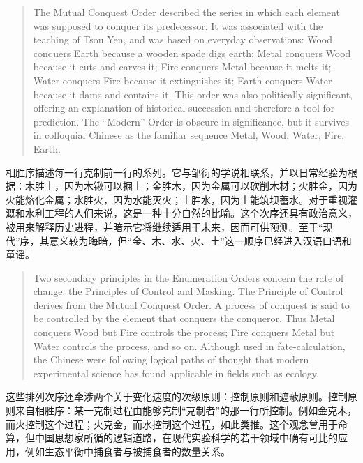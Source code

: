 \documentclass[UTF8,zihao=-4]{ctexart}
\newenvironment{enblock}
  {\par\smallskip\noindent{\scriptsize\bfseries English}\par\begin{quote}\small}
  {\end{quote}}
\newenvironment{zhblock}
  {\par\noindent{\scriptsize\bfseries 中文}\par}
  {\par\medskip}
\begin{document}
\begin{enblock}
The Mutual Conquest Order described the series in which each element was supposed to conquer its predecessor. It was associated with the teaching of Tsou Yen, and was based on everyday observations: Wood conquers Earth because a wooden spade digs earth; Metal conquers Wood because it cuts and carves it; Fire conquers Metal because it melts it; Water conquers Fire because it extinguishes it; Earth conquers Water because it dams and contains it. This order was also politically significant, offering an explanation of historical succession and therefore a tool for prediction. The ``Modern'' Order is obscure in significance, but it survives in colloquial Chinese as the familiar sequence Metal, Wood, Water, Fire, Earth.
\end{enblock}
\begin{zhblock}
相胜序描述每一行克制前一行的系列。它与邹衍的学说相联系，并以日常经验为根据：木胜土，因为木锹可以掘土；金胜木，因为金属可以砍削木材；火胜金，因为火能熔化金属；水胜火，因为水能灭火；土胜水，因为土能筑坝蓄水。对于重视灌溉和水利工程的人们来说，这是一种十分自然的比喻。这个次序还具有政治意义，被用来解释历史进程，并暗示它将继续适用于未来，因而可供预测。至于“现代”序，其意义较为晦暗，但“金、木、水、火、土”这一顺序已经进入汉语口语和童谣。
\end{zhblock}

\begin{enblock}
Two secondary principles in the Enumeration Orders concern the rate of change: the Principles of Control and Masking. The Principle of Control derives from the Mutual Conquest Order. A process of conquest is said to be controlled by the element that conquers the conqueror. Thus Metal conquers Wood but Fire controls the process; Fire conquers Metal but Water controls the process, and so on. Although used in fate-calculation, the Chinese were following logical paths of thought that modern experimental science has found applicable in fields such as ecology.
\end{enblock}
\begin{zhblock}
这些排列次序还牵涉两个关于变化速度的次级原则：控制原则和遮蔽原则。控制原则来自相胜序：某一克制过程由能够克制“克制者”的那一行所控制。例如金克木，而火控制这个过程；火克金，而水控制这个过程，如此类推。这个观念曾用于命算，但中国思想家所循的逻辑道路，在现代实验科学的若干领域中确有可比的应用，例如生态平衡中捕食者与被捕食者的数量关系。
\end{zhblock}
\end{document}

